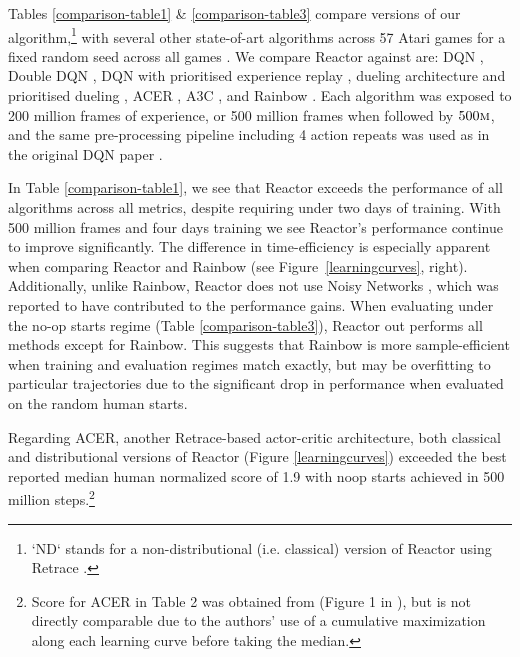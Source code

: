 \documentclass{article}
\begin{document}
Tables \ref{comparison-table1} \& \ref{comparison-table3} compare versions of our algorithm,\footnote{
  \label{reactorfootnote}
  `ND` stands for a non-distributional (i.e. classical) version of Reactor 
  using Retrace \citep{munos2016safe}.
} with several other state-of-art algorithms across 57 Atari games for a 
fixed random seed across all games \citep{bellemare2013arcade}. 
We compare Reactor against are: DQN \citep{mnih15human}, Double 
DQN \citep{van2016deep}, DQN with prioritised experience replay 
\citep{schaul2015prioritized}, dueling architecture and prioritised dueling 
\citep{wang2015dueling}, ACER \citep{wang2017sample}, A3C \citep{mnih2016asynchronous}, and Rainbow \citep{rainbow}. 
Each algorithm was exposed to 200 million 
frames of experience, or 500 million frames when followed by $500\textsc{m}$, and the same pre-processing 
pipeline including 4 action repeats was used as in the original DQN paper \citep{mnih15human}. 

In Table \ref{comparison-table1}, we see that Reactor exceeds the performance of all algorithms across all metrics, 
despite requiring under two days of training. With 500 million frames and four days training we see Reactor's performance 
continue to improve significantly. The difference in time-efficiency is especially apparent when 
comparing Reactor and Rainbow (see Figure~\ref{learningcurves}, right).
Additionally, unlike Rainbow, Reactor does not use Noisy Networks 
\citep{fortunato2017noisy}, which was reported to have contributed 
to the performance gains. When evaluating under the no-op starts regime (Table \ref{comparison-table3}), 
Reactor out performs all methods except for Rainbow. This suggests that Rainbow is more sample-efficient
when training and evaluation regimes match exactly, but may be overfitting to particular trajectories due to 
the significant drop in performance when evaluated on the random human starts.

Regarding ACER, another Retrace-based actor-critic 
architecture, both classical and distributional versions of Reactor (Figure 
\ref{learningcurves}) exceeded the best 
reported median human normalized score of 1.9 with noop starts achieved in 500 
million steps.\footnote{
  \label{acerfootnote}
  Score for ACER in Table 2 was obtained from (Figure 1 in 
  \cite{wang2017sample}), but is not directly comparable due to the authors' 
  use of a cumulative maximization along each learning curve before taking the median.
}
\end{document}
